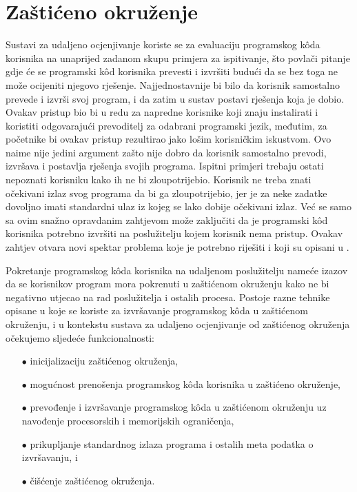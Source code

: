 \documentclass[times, utf8, diplomski]{fer}
\begin{document}
\section{Zaštićeno okruženje}
Sustavi za udaljeno ocjenjivanje koriste se za evaluaciju programskog kôda korisnika na unaprijed zadanom skupu primjera za ispitivanje, što povlači pitanje gdje će se programski kôd korisnika prevesti i izvršiti budući da se bez toga ne može ocijeniti njegovo rješenje. Najjednostavnije bi bilo da korisnik samostalno prevede i izvrši svoj program, i da zatim u sustav postavi rješenja koja je dobio. Ovakav pristup bio bi u redu za napredne korisnike koji znaju instalirati i koristiti odgovarajući prevoditelj za odabrani programski jezik, međutim, za početnike bi ovakav pristup rezultirao jako lošim korisničkim iskustvom. Ovo naime nije jedini argument zašto nije dobro da korisnik samostalno prevodi, izvršava i postavlja rješenja svojih programa. Ispitni primjeri trebaju ostati nepoznati korisniku kako ih ne bi zloupotrijebio. Korisnik ne treba znati očekivani izlaz  svog programa da bi ga zloupotrijebio, jer je za neke zadatke dovoljno imati standardni ulaz  iz kojeg se lako dobije očekivani izlaz. Već se samo sa ovim snažno opravdanim zahtjevom može zaključiti da je programski kôd korisnika potrebno izvršiti na poslužitelju kojem korisnik nema pristup. Ovakav zahtjev otvara novi spektar problema koje je potrebno riješiti i koji su opisani u \citep{kurnia2001online}.

Pokretanje programskog kôda korisnika na udaljenom poslužitelju nameće izazov da se korisnikov program mora pokrenuti u zaštićenom okruženju kako ne bi negativno utjecao na rad poslužitelja i ostalih procesa. Postoje razne tehnike opisane u \citep{yi2014comparison} koje se koriste za izvršavanje programskog kôda u zaštićenom okruženju, i u kontekstu sustava za udaljeno ocjenjivanje od zaštićenog okruženja očekujemo sljedeće funkcionalnosti:
\begin{itemize}
    \item[$\bullet$] inicijalizaciju zaštićenog okruženja,
    \item[$\bullet$] mogućnost prenošenja programskog kôda korisnika u zaštićeno okruženje,
    \item[$\bullet$] prevođenje i izvršavanje programskog kôda u zaštićenom okruženju uz navođenje procesorskih i memorijskih ograničenja,
    \item[$\bullet$] prikupljanje standardnog izlaza  programa i ostalih meta podatka o izvršavanju, i
    \item[$\bullet$] čišćenje  zaštićenog okruženja.
\end{itemize}
\end{document}
